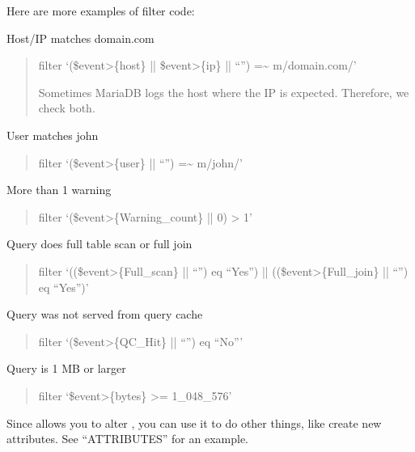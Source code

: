 \documentclass[letterpaper,10pt,english]{sphinxmanual}
\begin{document}
\begin{fulllineitems}
Here are more examples of filter code:

Host/IP matches domain.com
\begin{quote}

\textendash{}filter ‘(\$event\sphinxhyphen{}\textgreater{}\{host\} || \$event\sphinxhyphen{}\textgreater{}\{ip\} || “”) =\textasciitilde{} m/domain.com/’

Sometimes MariaDB logs the host where the IP is expected.  Therefore, we
check both.
\end{quote}

User matches john
\begin{quote}

\textendash{}filter ‘(\$event\sphinxhyphen{}\textgreater{}\{user\} || “”) =\textasciitilde{} m/john/’
\end{quote}

More than 1 warning
\begin{quote}

\textendash{}filter ‘(\$event\sphinxhyphen{}\textgreater{}\{Warning\_count\} || 0) \textgreater{} 1’
\end{quote}

Query does full table scan or full join
\begin{quote}

\textendash{}filter ‘((\$event\sphinxhyphen{}\textgreater{}\{Full\_scan\} || “”) eq “Yes”) || ((\$event\sphinxhyphen{}\textgreater{}\{Full\_join\} || “”) eq “Yes”)’
\end{quote}

Query was not served from query cache
\begin{quote}

\textendash{}filter ‘(\$event\sphinxhyphen{}\textgreater{}\{QC\_Hit\} || “”) eq “No”’
\end{quote}

Query is 1 MB or larger
\begin{quote}

\textendash{}filter ‘\$event\sphinxhyphen{}\textgreater{}\{bytes\} \textgreater{}= 1\_048\_576’
\end{quote}

Since {\hyperref[\detokenize{mariadb-query-digest:cmdoption-mariadb-query-digest-filter}]{}} allows you to alter , you can use it to do other
things, like create new attributes.  See “ATTRIBUTES” for an example.

\end{fulllineitems}
\end{document}
